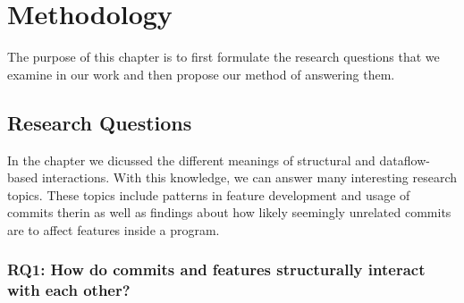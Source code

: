 \chapter{Methodology}\label{ch:methodology}

The purpose of this chapter is to first formulate the research questions that we examine in our work
and then propose our method of answering them.

\section{Research Questions}\label{sec:research_questions}

In the  chapter we dicussed the different meanings of structural and dataflow-based interactions.
With this knowledge, we can answer many interesting research topics. 
These topics include patterns in feature development and usage of commits therin as well as findings about how likely seemingly unrelated commits are to affect features inside a program.

\subsection*{\textbf{RQ1: How do commits and features structurally interact with each other?}}

